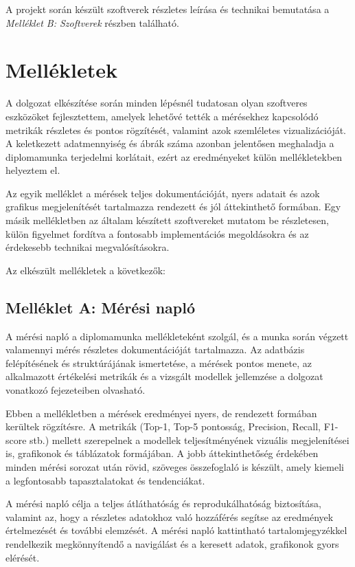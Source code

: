         A projekt során készült szoftverek részletes leírása és technikai bemutatása a \textit{Melléklet B: Szoftverek} részben található.        

    \section{Mellékletek}
        A dolgozat elkészítése során minden lépésnél tudatosan olyan szoftveres eszközöket fejlesztettem, amelyek lehetővé tették a mérésekhez kapcsolódó metrikák részletes és pontos rögzítését, valamint azok szemléletes vizualizációját. A keletkezett adatmennyiség és ábrák száma azonban jelentősen meghaladja a diplomamunka terjedelmi korlátait, ezért az eredményeket külön mellékletekben helyeztem el.

        Az egyik melléklet a mérések teljes dokumentációját, nyers adatait és azok grafikus megjelenítését tartalmazza rendezett és jól áttekinthető formában. Egy másik mellékletben az általam készített szoftvereket mutatom be részletesen, külön figyelmet fordítva a fontosabb implementációs megoldásokra és az érdekesebb technikai megvalósításokra.
        
        Az elkészült mellékletek a következők:
    
        \subsection{Melléklet A: Mérési napló}
        A mérési napló a diplomamunka mellékleteként szolgál, és a munka során végzett valamennyi mérés részletes dokumentációját tartalmazza. Az adatbázis felépítésének és struktúrájának ismertetése, a mérések pontos menete, az alkalmazott értékelési metrikák és a vizsgált modellek jellemzése a dolgozat vonatkozó fejezeteiben olvasható.
        
        Ebben a mellékletben a mérések eredményei nyers, de rendezett formában kerültek rögzítésre. A metrikák (Top-1, Top-5 pontosság, Precision, Recall, F1-score stb.) mellett szerepelnek a modellek teljesítményének vizuális megjelenítései is, grafikonok és táblázatok formájában. A jobb áttekinthetőség érdekében minden mérési sorozat után rövid, szöveges összefoglaló is készült, amely kiemeli a legfontosabb tapasztalatokat és tendenciákat.
        
        A mérési napló célja a teljes átláthatóság és reprodukálhatóság biztosítása, valamint az, hogy a részletes adatokhoz való hozzáférés segítse az eredmények értelmezését és további elemzését. A mérési napló kattintható tartalomjegyzékkel rendelkezik megkönnyítendő a navigálást és a keresett adatok, grafikonok gyors elérését.       

